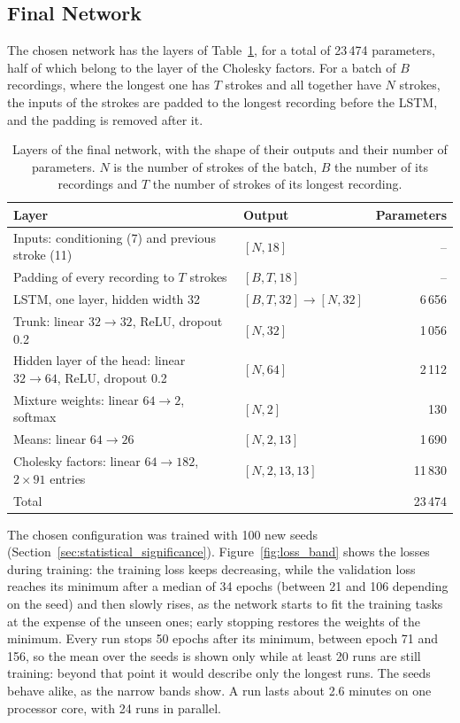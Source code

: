 \documentclass[12pt]{report}
\begin{document}
\subsection{Final Network}
The chosen network has the layers of Table~\ref{tab:final_network}, for a total of 23\,474 parameters, half of which belong to the layer of the Cholesky factors. For a batch of $B$ recordings, where the longest one has $T$ strokes and all together have $N$ strokes, the inputs of the strokes are padded to the longest recording before the LSTM, and the padding is removed after it.

\begin{table}[htbp]
    \centering
    \caption{Layers of the final network, with the shape of their outputs and their number of parameters. $N$ is the number of strokes of the batch, $B$ the number of its recordings and $T$ the number of strokes of its longest recording.}
    \label{tab:final_network}
    \small
    \begin{tabular}{llr}
        \toprule
        Layer & Output & Parameters\\
        \midrule
        Inputs: conditioning (7) and previous stroke (11) & $[N,18]$ & --\\
        Padding of every recording to $T$ strokes & $[B,T,18]$ & --\\
        LSTM, one layer, hidden width 32 & $[B,T,32]\rightarrow[N,32]$ & 6\,656\\
        Trunk: linear $32\rightarrow32$, ReLU, dropout 0.2 & $[N,32]$ & 1\,056\\
        Hidden layer of the head: linear $32\rightarrow64$, ReLU, dropout 0.2 & $[N,64]$ & 2\,112\\
        Mixture weights: linear $64\rightarrow2$, softmax & $[N,2]$ & 130\\
        Means: linear $64\rightarrow26$ & $[N,2,13]$ & 1\,690\\
        Cholesky factors: linear $64\rightarrow182$, $2\times91$ entries & $[N,2,13,13]$ & 11\,830\\
        \midrule
        Total & & 23\,474\\
        \bottomrule
    \end{tabular}
\end{table}

The chosen configuration was trained with 100 new seeds (Section~\ref{sec:statistical_significance}). Figure~\ref{fig:loss_band} shows the losses during training: the training loss keeps decreasing, while the validation loss reaches its minimum after a median of 34 epochs (between 21 and 106 depending on the seed) and then slowly rises, as the network starts to fit the training tasks at the expense of the unseen ones; early stopping restores the weights of the minimum. Every run stops 50 epochs after its minimum, between epoch 71 and 156, so the mean over the seeds is shown only while at least 20 runs are still training: beyond that point it would describe only the longest runs. The seeds behave alike, as the narrow bands show. A run lasts about 2.6 minutes on one processor core, with 24 runs in parallel.
\end{document}

